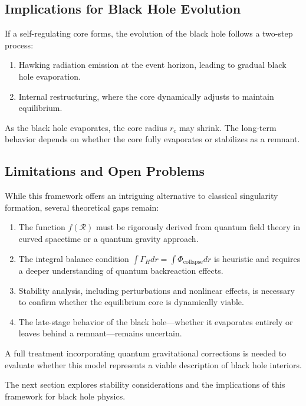 \subsection{Implications for Black Hole Evolution}

If a self-regulating core forms, the evolution of the black hole follows a two-step process:
\begin{enumerate}
    \item Hawking radiation emission at the event horizon, leading to gradual black hole evaporation.
    \item Internal restructuring, where the core dynamically adjusts to maintain equilibrium.
\end{enumerate}

As the black hole evaporates, the core radius \( r_c \) may shrink. The long-term behavior depends on whether the core fully evaporates or stabilizes as a remnant.

\subsection{Limitations and Open Problems}

While this framework offers an intriguing alternative to classical singularity formation, several theoretical gaps remain:
\begin{enumerate}
    \item The function \( f(\mathcal{R}) \) must be rigorously derived from quantum field theory in curved spacetime or a quantum gravity approach.
    \item The integral balance condition \( \int \Gamma_H dr = \int \Phi_{\text{collapse}} dr \) is heuristic and requires a deeper understanding of quantum backreaction effects.
    \item Stability analysis, including perturbations and nonlinear effects, is necessary to confirm whether the equilibrium core is dynamically viable.
    \item The late-stage behavior of the black hole—whether it evaporates entirely or leaves behind a remnant—remains uncertain.
\end{enumerate}

A full treatment incorporating quantum gravitational corrections is needed to evaluate whether this model represents a viable description of black hole interiors.

The next section explores stability considerations and the implications of this framework for black hole physics.
